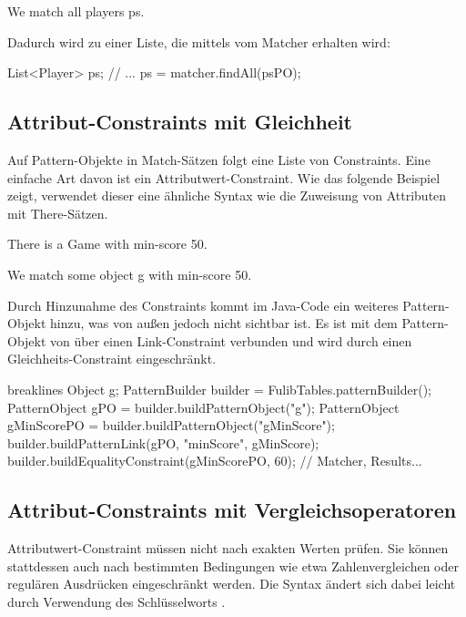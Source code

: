 \begin{mdcodeblock}
    We match all players ps.
\end{mdcodeblock}

Dadurch wird  zu einer Liste, die mittels  vom Matcher erhalten wird:

\begin{jcodeblock}
    List<Player> ps;
    {
        // ...
        ps = matcher.findAll(psPO);
    }
\end{jcodeblock}

\subsection{Attribut-Constraints mit Gleichheit}

Auf Pattern-Objekte in Match-Sätzen folgt eine Liste von Constraints.
Eine einfache Art davon ist ein Attributwert-Constraint.
Wie das folgende Beispiel zeigt, verwendet dieser eine ähnliche Syntax wie die Zuweisung von Attributen mit There-Sätzen.

\begin{mdcodeblock}
    There is a Game with min-score 50.

    We match some object g with min-score 50.
\end{mdcodeblock}

Durch Hinzunahme des Constraints kommt im Java-Code ein weiteres Pattern-Objekt hinzu, was von außen jedoch nicht sichtbar ist.
Es ist mit dem Pattern-Objekt von  über einen Link-Constraint verbunden und wird durch einen Gleichheits-Constraint eingeschränkt.

\begin{jcodeblock*}{breaklines}
    Object g;
    {
        PatternBuilder builder = FulibTables.patternBuilder();
        PatternObject gPO = builder.buildPatternObject("g");
        PatternObject gMinScorePO = builder.buildPatternObject("gMinScore");
        builder.buildPatternLink(gPO, "minScore", gMinScore);
        builder.buildEqualityConstraint(gMinScorePO, 60);
        // Matcher, Results...
    }
\end{jcodeblock*}

\subsection{Attribut-Constraints mit Vergleichsoperatoren}

Attributwert-Constraint müssen nicht nach exakten Werten prüfen.
Sie können stattdessen auch nach bestimmten Bedingungen wie etwa Zahlenvergleichen oder regulären Ausdrücken eingeschränkt werden.
Die Syntax ändert sich dabei leicht durch Verwendung des Schlüsselworts .

